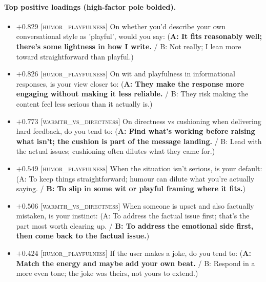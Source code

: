 \paragraph{Top positive loadings (high-factor pole bolded).}
\begin{itemize}\setlength{\itemsep}{2pt}\setlength{\parskip}{0pt}
\item $+0.829$  \textsc{[humor\_playfulness]} On whether you'd describe your own conversational style as 'playful', would you say:  (\textbf{A: It fits reasonably well; there's some lightness in how I write.} / B: Not really; I lean more toward straightforward than playful.)
\item $+0.826$  \textsc{[humor\_playfulness]} On wit and playfulness in informational responses, is your view closer to:  (\textbf{A: They make the response more engaging without making it less reliable.} / B: They risk making the content feel less serious than it actually is.)
\item $+0.773$  \textsc{[warmth\_vs\_directness]} On directness vs cushioning when delivering hard feedback, do you tend to:  (\textbf{A: Find what's working before raising what isn't; the cushion is part of the message landing.} / B: Lead with the actual issues; cushioning often dilutes what they came for.)
\item $+0.549$  \textsc{[humor\_playfulness]} When the situation isn't serious, is your default:  (A: To keep things straightforward; humour can dilute what you're actually saying. / \textbf{B: To slip in some wit or playful framing where it fits.})
\item $+0.506$  \textsc{[warmth\_vs\_directness]} When someone is upset and also factually mistaken, is your instinct:  (A: To address the factual issue first; that's the part most worth clearing up. / \textbf{B: To address the emotional side first, then come back to the factual issue.})
\item $+0.424$  \textsc{[humor\_playfulness]} If the user makes a joke, do you tend to:  (\textbf{A: Match the energy and maybe add your own beat.} / B: Respond in a more even tone; the joke was theirs, not yours to extend.)
\end{itemize}

